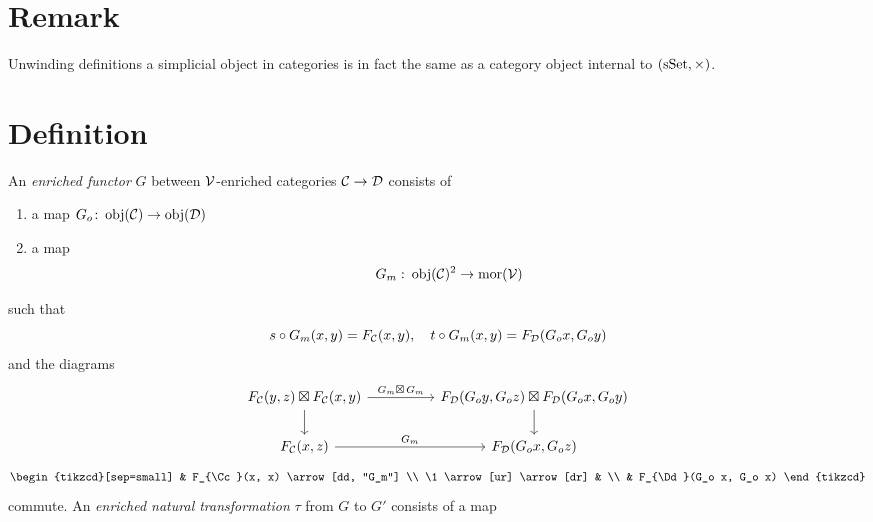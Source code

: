    \section{Remark}
        Unwinding definitions a simplicial object in categories is in fact the same as a category object internal to $(\operatorname{sSet}, \times)$.

    \section{Definition}
        An \emph{enriched functor} $G$ between $\mathcal{V}$-enriched categories $\mathcal{C} \to \mathcal{D}$ consists of
        \begin{enumerate}[label=\roman*)]
            \item 
                a map $G_o \colon \operatorname{obj}(\mathcal{C}) \to \operatorname{obj}(\mathcal{D})$
            \item 
                a map
                \begin{equation*}
                    G_m \,\colon \operatorname{obj}(\mathcal{C})^2 \to \operatorname{mor}(\mathcal{V})
                \end{equation*}
        \end{enumerate}
        such that
        \begin{equation*}
            s \circ G_m(x, y) = F_{\mathcal{C}}(x, y), \quad t \circ G_m(x, y) = F_{\mathcal{D}}(G_o x, G_o y)
        \end{equation*}
        and the diagrams
        \begin{equation*}
            \begin{tikzcd}[column sep=huge]
                F_{\Cc}(y, z) \boxtimes F_{\Cc}(x, y) \arrow[r, "G_m \boxtimes\, G_m"] \arrow[d] & F_{\Dd}(G_o y, G_o z) \boxtimes F_{\Dd}(G_o x, G_o y) \arrow[d] \\
                F_{\Cc}(x, z) \arrow[r, "G_m"] & F_{\Dd}(G_o x, G_o z)
            \end{tikzcd}
        \end{equation*}
        \begin{equation*}
            \begin{tikzcd}[sep=small]
                & F_{\Cc}(x, x) \arrow[dd, "G_m"] \\
                \1 \arrow[ur] \arrow[dr] & \\
                & F_{\Dd}(G_o x, G_o x)
            \end{tikzcd}
        \end{equation*}
        commute. An \emph{enriched natural transformation} $\tau$ from $G$ to $G'$ consists of a map

